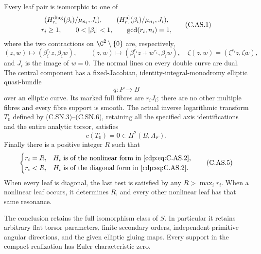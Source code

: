 \begin{proposition}
Every leaf pair is isomorphic to one of
\[
 \begin{gathered}
 (H^{\rm diag}_{r_i}(\beta_i)/\mu_{n_i},J_i),\qquad
 (H^{\rm nl}_{r_i}(\beta_i)/\mu_{n_i},J_i),\\
 r_i\ge1,\qquad 0<|\beta_i|<1,\qquad \gcd(r_i,n_i)=1 ,
 \end{gathered}                                             \tag{C.AS.1}\label{cdp:eq:C.AS.1}
\]
where the two contractions on $\C^2\setminus\{0\}$ are,
respectively,
\[
 (z,w)\longmapsto(\beta_i^{r_i}z,\beta_iw),\qquad
 (z,w)\longmapsto(\beta_i^{r_i}z+w^{r_i},\beta_iw),
 \quad
 \zeta(z,w)=(\zeta^{r_i}z,\zeta w),                         \tag{C.AS.2}\label{cdp:eq:C.AS.2}
\]
and $J_i$ is the image of $w=0$. The normal lines on every
double curve are dual. The central component has a
fixed-Jacobian, identity-integral-monodromy elliptic
quasi-bundle
\[
                         q:P\longrightarrow B             \tag{C.AS.3}\label{cdp:eq:C.AS.3}
\]
over an elliptic curve. Its marked full fibres are $r_iJ_i$;
there are no other multiple fibres and every fibre support
is smooth. The actual inverse logarithmic transform $T_0$
defined by (C.SN.3)--(C.SN.6), retaining all the specified
axis identifications and the entire analytic torsor,
satisfies
\[
                         c(T_0)=0\in H^2(B,\Lambda_F).     \tag{C.AS.4}\label{cdp:eq:C.AS.4}
\]
Finally there is a positive integer $R$ such that
\[
 \begin{cases}
 r_i=R,&H_i\text{ is of the nonlinear form in \eqref{cdp:eq:C.AS.2}},\\
 r_i<R,&H_i\text{ is of the diagonal form in \eqref{cdp:eq:C.AS.2}}.
 \end{cases}                                             \tag{C.AS.5}\label{cdp:eq:C.AS.5}
\]
When every leaf is diagonal, the last test is satisfied by
any $R>\max_i r_i$. When a nonlinear leaf occurs, it
determines $R$, and every other nonlinear leaf has that
same resonance.

The conclusion retains the full isomorphism class of $S$.
In particular it retains arbitrary flat torsor parameters,
finite secondary orders, independent primitive angular
directions, and the given elliptic gluing maps. Every support
in the compact realization has Euler characteristic zero.
\end{proposition}


